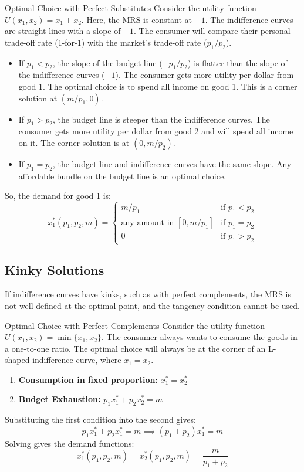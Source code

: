 \begin{examplebox}{Optimal Choice with Perfect Substitutes}
Consider the utility function $U(x_1, x_2) = x_1 + x_2$. Here, the MRS is constant at $-1$. The indifference curves are straight lines with a slope of $-1$. The consumer will compare their personal trade-off rate (1-for-1) with the market's trade-off rate ($p_1/p_2$).
\begin{itemize}
    \item If $p_1 < p_2$, the slope of the budget line ($-p_1/p_2$) is flatter than the slope of the indifference curves ($-1$). The consumer gets more utility per dollar from good 1. The optimal choice is to spend all income on good 1. This is a corner solution at $(m/p_1, 0)$.
    \item If $p_1 > p_2$, the budget line is steeper than the indifference curves. The consumer gets more utility per dollar from good 2 and will spend all income on it. The corner solution is at $(0, m/p_2)$.
    \item If $p_1 = p_2$, the budget line and indifference curves have the same slope. Any affordable bundle on the budget line is an optimal choice.
\end{itemize}
So, the demand for good 1 is:
\[ x_1^*(p_1, p_2, m) = \begin{cases} m/p_1 & \text{if } p_1 < p_2 \\ \text{any amount in } [0, m/p_1] & \text{if } p_1 = p_2 \\ 0 & \text{if } p_1 > p_2 \end{cases} \]
\end{examplebox}

\subsection{Kinky Solutions}
If indifference curves have kinks, such as with perfect complements, the MRS is not well-defined at the optimal point, and the tangency condition cannot be used.

\begin{examplebox}{Optimal Choice with Perfect Complements}
Consider the utility function $U(x_1, x_2) = \min\{x_1, x_2\}$. The consumer always wants to consume the goods in a one-to-one ratio. The optimal choice will always be at the corner of an L-shaped indifference curve, where $x_1 = x_2$.
\begin{enumerate}
    \item \textbf{Consumption in fixed proportion:} $x_1^* = x_2^*$
    \item \textbf{Budget Exhaustion:} $p_1x_1^* + p_2x_2^* = m$
\end{enumerate}
Substituting the first condition into the second gives:
\[ p_1x_1^* + p_2x_1^* = m \implies (p_1+p_2)x_1^* = m \]
Solving gives the demand functions:
\[ x_1^*(p_1, p_2, m) = x_2^*(p_1, p_2, m) = \frac{m}{p_1+p_2} \]
\end{examplebox}